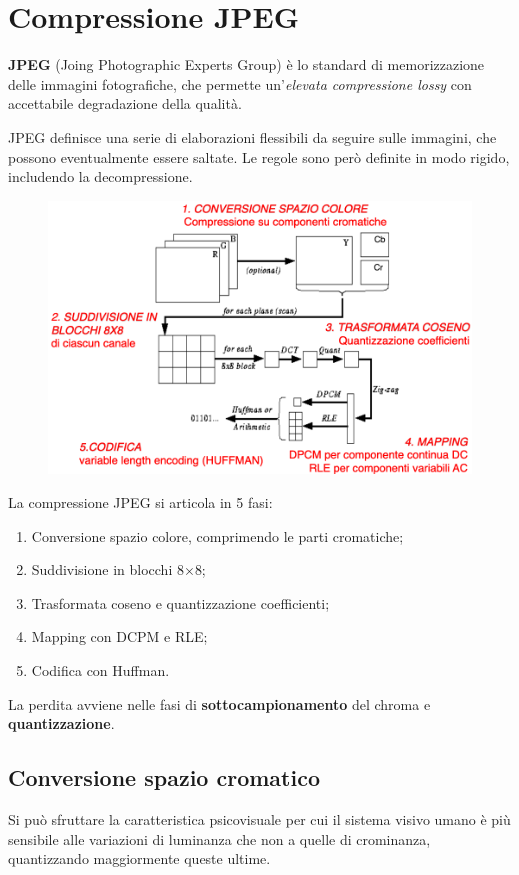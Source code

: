 \section{Compressione JPEG}
\textbf{JPEG} (Joing Photographic Experts Group) è lo standard di memorizzazione delle immagini fotografiche, che permette un'\textit{elevata compressione lossy} con accettabile degradazione della qualità. 

JPEG definisce una serie di elaborazioni flessibili da seguire sulle immagini, che possono eventualmente essere saltate. Le regole sono però definite in modo rigido, includendo la decompressione.

\begin{figure}[h]
	\centering
	\includegraphics[scale=0.37]{Lezioni/Immagini/jpeg}
\end{figure}

La compressione JPEG si articola in 5 fasi:
\begin{enumerate}
	\item Conversione spazio colore, comprimendo le parti cromatiche;
	\item Suddivisione in blocchi 8$\times$8;
	\item Trasformata coseno e quantizzazione coefficienti;
	\item Mapping con DCPM e RLE;
	\item Codifica con Huffman.
\end{enumerate}
La perdita avviene nelle fasi di \textbf{sottocampionamento} del chroma e \textbf{quantizzazione}. 

\subsection{Conversione spazio cromatico}
Si può sfruttare la caratteristica psicovisuale per cui il sistema visivo umano è più sensibile alle variazioni di luminanza che non a quelle di crominanza, quantizzando maggiormente queste ultime.

